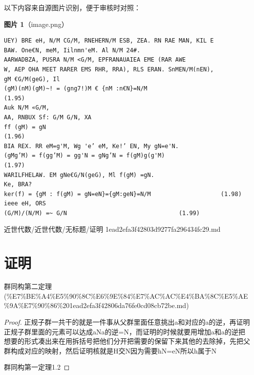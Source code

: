\begin{note}
以下内容来自源图片识别，便于审核时对照：

\textbf{图片 1}（image.png）
\begin{Verbatim}[fontsize=\small]
UEY) BRE eH, N/M CG/M, RNEHERN/M ESB, ZEA. RN RAE MAN, KIL E
BAW. One€N, meM, Iilnmn'eM. Al N/M 24#.
AARWADBZA, PUSRA N/M <G/M, EPFRANAUAIEA EME (RAR AWE
W, AEP OHA MEET RARER EMS RHR, RRA), RLS ERAN. SnMEN/M(nEN),
gM €G/M(geG), Il
(gM)(nM)(gM)~! = (gng7!)M € {nM :n€N}=N/M                            (1.95)
Auk N/M «G/M,
AA, RNBUX Sf: G/M G/N, XA
ff (gM) = gN                                                              (1.96)
BIA REX. RR eM=g'M, Wg 'e’ eM, Ke!’ EN, My gN=e'N.
(gMg’M) = f(gg’M) = gg'N = gNg’N = f(gM)g(g'M)                               (1.97)
WARILFHELAW. EM gNe€G/N(geG), Ml f(gM) =gN.
Ke, BRA?
ker(f) = {gM : f(gM) = gN=eN}={gM:geN}=N/M                    (1.98)
ieee eH, ORS
(G/M)/(N/M) =~ G/N                                (1.99)
\end{Verbatim}

\end{note}

\begin{note}[来源路径]

近世代数/近世代数/无标题/证明 1ead2efa3f42803d9277fa296434fc29.md

\end{note}

\section*{证明}

\begin{note}[来源上级主题]

群同构第二定理 (\%E7\%BE\%A4\%E5\%90\%8C\%E6\%9E\%84\%E7\%AC\%AC\%E4\%BA\%8C\%E5\%AE\%9A\%E7\%90\%86\%201ead2efa3f42806da76fe0cd08cb72be.md)

\end{note}

\begin{proof}

正规子群一共干的就是一件事从父群里面任意挑出a和对应的a的逆，再证明正规子群里面的元素可以达成aNa的逆=N，而证明的时候就要用增加a和a的逆把想要的形式凑出来在用拆括号把他们分开把需要的保留下来其他的去除掉，先把父群构成对应的映射，然后证明核就是H交N因为需要hN=eN所以h属于N

群同构第一定理1.2

\end{proof}

